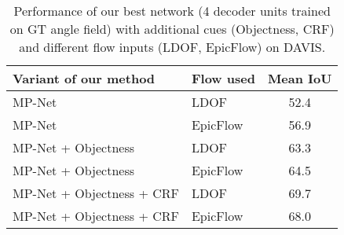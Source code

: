 \documentclass[10pt,twocolumn,letterpaper]{article}
\begin{document}
\begin{table}[t]
\begin{center}
\begin{tabular}{l|l|c}
\hline
Variant of our method & Flow used & Mean IoU \\
\hline
MP-Net & LDOF  & 52.4  \\
MP-Net & EpicFlow  & 56.9  \\
MP-Net + Objectness & LDOF  & 63.3 \\
MP-Net + Objectness & EpicFlow  & 64.5 \\
MP-Net + Objectness + CRF & LDOF  & 69.7  \\
MP-Net + Objectness + CRF & EpicFlow  & 68.0  \\
\hline
\end{tabular}
\vspace{0.1cm}
\caption{Performance of our best network (4 decoder units trained on GT angle
field) with additional cues (Objectness, CRF) and different flow inputs (LDOF,
EpicFlow) on DAVIS.\vspace{-1.00cm}}
\label{tbl:davis}
\end{center}
\end{table}
\end{document}
